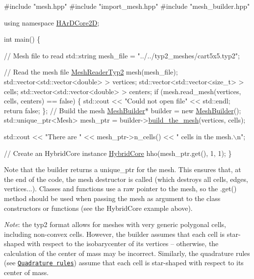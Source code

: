 \begin{DoxyCode}
\textcolor{preprocessor}{#include "mesh.hpp"}
\textcolor{preprocessor}{#include "import\_mesh.hpp"}
\textcolor{preprocessor}{#include "mesh\_builder.hpp"}

\textcolor{keyword}{using namespace }\hyperlink{namespaceHArDCore2D}{HArDCore2D};

\textcolor{keywordtype}{int} main() \{

    \textcolor{comment}{// Mesh file to read}
    std::string mesh\_file = \textcolor{stringliteral}{"../../typ2\_meshes/cart5x5.typ2"};

    \textcolor{comment}{// Read the mesh file}
    \hyperlink{classHArDCore2D_1_1MeshReaderTyp2}{MeshReaderTyp2} mesh(mesh\_file);
    std::vector<std::vector<double> > vertices;
    std::vector<std::vector<size\_t> > cells;
    std::vector<std::vector<double> > centers;
    \textcolor{keywordflow}{if} (mesh.read\_mesh(vertices, cells, centers) == \textcolor{keyword}{false}) \{
        std::cout << \textcolor{stringliteral}{"Could not open file"} << std::endl;
        \textcolor{keywordflow}{return} \textcolor{keyword}{false};
    \};
    \textcolor{comment}{// Build the mesh}
    \hyperlink{classHArDCore2D_1_1MeshBuilder}{MeshBuilder}* builder = \textcolor{keyword}{new} \hyperlink{classHArDCore2D_1_1MeshBuilder}{MeshBuilder}();
    std::unique\_ptr<Mesh> mesh\_ptr = builder->\hyperlink{classHArDCore2D_1_1MeshBuilder_a0ef4a78ac64d1bcb6380317ea866758d}{build\_the\_mesh}(vertices, cells);

    std::cout << \textcolor{stringliteral}{"There are "} << mesh\_ptr->n\_cells() << \textcolor{stringliteral}{" cells in the mesh.\(\backslash\)n"};

    \textcolor{comment}{// Create an HybridCore instance}
    \hyperlink{classHArDCore2D_1_1HybridCore}{HybridCore} hho(mesh\_ptr.get(), 1, 1);
\}
\end{DoxyCode}


Note that the builder returns a {\ttfamily unique\+\_\+ptr} for the mesh. This ensures that, at the end of the code, the mesh destructor is called (which destroys all cells, edges, vertices...). Classes and functions use a raw pointer to the mesh, so the {\ttfamily .get()} method should be used when passing the mesh as argument to the class constructors or functions (see the {\ttfamily Hybrid\+Core} example above).

{\itshape Note}\+: the {\ttfamily typ2} format allows for meshes with very generic polygonal cells, including non-\/convex cells. However, the builder assumes that each cell is star-\/shaped with respect to the isobarycenter of its vertices -- otherwise, the calculation of the center of mass may be incorrect. Similarly, the quadrature rules (see \href{#quad_rules}{\tt Quadrature rules}) assume that each cell is star-\/shaped with respect to its center of mass.

